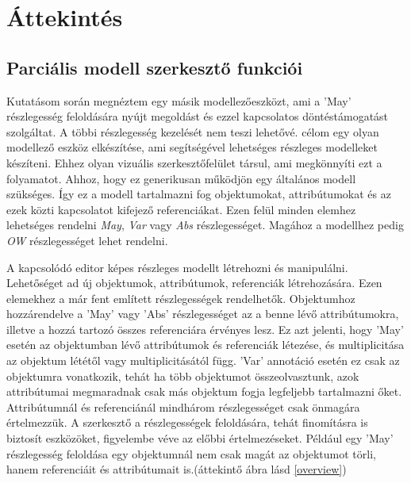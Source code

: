 \chapter{Áttekintés}\label{chapter:overview}

\section{Parciális modell szerkesztő funkciói}
Kutatásom során megnéztem egy másik modellezőeszközt, ami a 'May' részlegesség feloldására nyújt megoldást és ezzel kapcsolatos döntéstámogatást szolgáltat\cite{Michalis}. A többi részlegesség kezelését nem teszi lehetővé. célom egy olyan modellező eszköz elkészítése, ami segítségével lehetséges részleges modelleket készíteni. Ehhez olyan vizuális szerkesztőfelület társul, ami megkönnyíti ezt a folyamatot. Ahhoz, hogy ez generikusan működjön egy általános modell szükséges. Így ez a modell tartalmazni fog objektumokat, attribútumokat és az ezek közti kapcsolatot kifejező referenciákat. Ezen felül minden elemhez lehetséges rendelni \textit{May}, \textit{Var} vagy \textit{Abs} részlegességet. Magához a modellhez pedig \textit{OW} részlegességet lehet rendelni.
\par
A kapcsolódó editor képes részleges modellt létrehozni és manipulálni. Lehetőséget ad új objektumok, attribútumok, referenciák létrehozására. Ezen elemekhez a már fent említett részlegességek rendelhetők. Objektumhoz hozzárendelve a 'May' vagy 'Abs' részlegességet az a benne lévő attribútumokra, illetve a hozzá tartozó összes referenciára érvényes lesz. Ez azt jelenti, hogy 'May' esetén az objektumban lévő attribútumok és referenciák létezése, és multiplicitása az objektum lététől vagy multiplicitásától függ.  'Var' annotáció esetén ez csak az objektumra vonatkozik, tehát ha több objektumot összeolvasztunk, azok attribútumai megmaradnak csak más objektum fogja legfeljebb tartalmazni őket. Attribútumnál és referenciánál mindhárom részlegességet csak önmagára értelmezzük. A szerkesztő a részlegességek feloldására, tehát finomításra is biztosít eszközöket, figyelembe véve az előbbi értelmezéseket. Például egy 'May' részlegesség feloldása egy objektumnál nem csak magát az objektumot törli, hanem referenciáit és attribútumait is.(áttekintő ábra lásd \autoref{overview})



